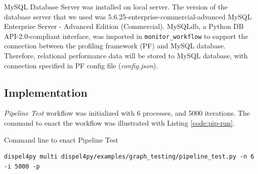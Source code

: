 \documentclass[10pt,twoside,openright,logo]{report}
\begin{document}
MySQL Database Server was installed on local server. The version of the database server that we used was 5.6.25-enterprise-commercial-advanced MySQL Enterprise Server - Advanced Edition (Commercial). MySQLdb, a Python DB API-2.0-compliant interface, was imported in \texttt{monitor_workflow} to support the connection between the profiling framework (PF) and MySQL database. Therefore, relational performance data will be stored to MySQL database, with connection specified in PF config file (\textit{config.json}).

\subsection{Implementation}
\textit{Pipeline Test} workflow was initialized with 6 processes, and 5000 iterations.
The command to enact the workflow was illustrated with Listing \ref{code:pip-run}.
\begin{listing}
\caption{Command line to enact Pipeline Test}
\label{code:pip-run}
\begin{verbatim}
dispel4py multi dispel4py/examples/graph_testing/pipeline_test.py -n 6 -i 5000 -p
\end{verbatim}
\end{listing}
\end{document}
